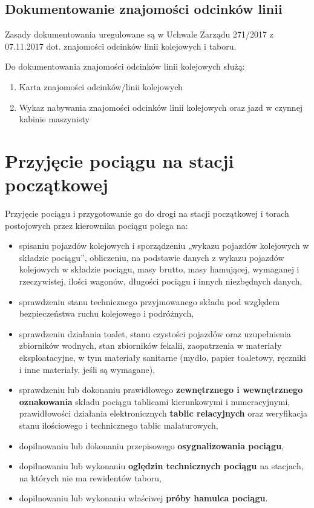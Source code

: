\subsection{Dokumentowanie znajomości odcinków linii}

Zasady dokumentowania uregulowane są w Uchwale Zarządu 271/2017 z 07.11.2017 dot. znajomości odcinków linii kolejowych i taboru.

Do dokumentowania znajomości odcinków linii kolejowych służą:
\begin{enumerate}
	\item Karta znajomości odcinków/linii kolejowych
	\item Wykaz nabywania znajomości odcinków linii kolejowych oraz jazd w czynnej kabinie maszynisty
\end{enumerate}


\section{Przyjęcie pociągu na stacji początkowej}
Przyjęcie pociągu i przygotowanie go do drogi na stacji początkowej i torach
postojowych przez kierownika pociągu polega na:
\begin{itemize}
	\item spisaniu pojazdów kolejowych i sporządzeniu „wykazu pojazdów kolejowych w składzie pociągu”, obliczeniu, na podstawie danych z wykazu pojazdów kolejowych w składzie pociągu, masy brutto, masy hamującej, wymaganej i rzeczywistej, ilości wagonów, długości pociągu i innych niezbędnych danych,
	\item sprawdzeniu stanu technicznego przyjmowanego składu pod względem bezpieczeństwa ruchu kolejowego i podróżnych,
	\item sprawdzeniu działania toalet, stanu czystości pojazdów oraz uzupełnienia zbiorników wodnych, stan zbiorników fekalii, zaopatrzenia w materiały eksploatacyjne, w tym materiały sanitarne (mydło, papier toaletowy, ręczniki i inne materiały, jeśli są wymagane),
	\item sprawdzeniu lub dokonaniu prawidłowego \textbf{zewnętrznego i wewnętrznego oznakowania} składu pociągu tablicami kierunkowymi i numeracyjnymi,
	prawidłowości działania elektronicznych \textbf{tablic relacyjnych} oraz weryfikacja	stanu ilościowego i technicznego tablic malaturowych,
	\item dopilnowaniu lub dokonaniu przepisowego \textbf{osygnalizowania pociągu},
	\item dopilnowaniu lub wykonaniu \textbf{oględzin technicznych pociągu} na stacjach, na których nie ma rewidentów taboru,
	\item dopilnowaniu lub wykonaniu właściwej \textbf{próby hamulca pociągu}.
\end{itemize}

